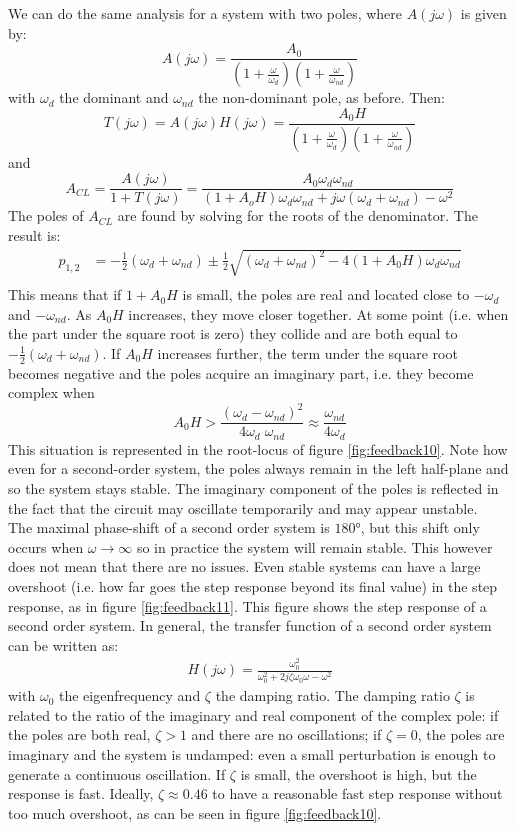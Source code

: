 We can do the same analysis for a system with two poles, where $A(j\omega)$ is given by:
$$
A(j \omega) = \frac{A_0}{(1 + \frac{\omega}{\omega_d})(1 + \frac{\omega}{\omega_{nd}})}
$$
with $\omega_d$ the dominant and $\omega_{nd}$ the non-dominant pole, as before. Then:
$$T(j\omega) = A(j\omega) H(j\omega) = \frac{A_0 H}{(1 + \frac{\omega}{\omega_d})(1 + \frac{\omega}{\omega_{nd}})}$$
and
$$
A_{CL} = \frac{A(j\omega)}{1 + T(j\omega)} = \frac{A_0 \omega_d \omega_{nd}}{(1 + A_o H) \omega_d \omega_{nd} + j\omega(\omega_d + \omega_{nd}) - \omega^2}
$$
The poles of $A_{CL}$ are found by solving for the roots of the denominator. The result is:
\begin{align*}
p_{1, 2} &= -\frac{1}{2}(\omega_d + \omega_{nd}) \pm \frac{1}{2} \sqrt{ (\omega_d + \omega_{nd})^2 - 4(1 + A_0H)\omega_d \omega_{nd}} \\
\end{align*}
This means that if $1+A_0H$ is small, the poles are real and located close to $-\omega_d$ and $-\omega_{nd}$. As $A_0H$ increases, they move closer together. At some point (i.e. when the part under the square root is zero) they collide and are both equal to $-\frac{1}{2}(\omega_d + \omega_{nd})$. If  $A_0H$ increases further, the term under the square root becomes negative and the poles acquire an imaginary part, i.e. they become complex when 
$$A_0H > \frac{(\omega_d - \omega_{nd})^2}{4 \omega_d \; \omega_{nd}} \approx \frac{\omega_{nd}}{4\omega_d}$$
This situation is represented in the root-locus of figure \ref{fig:feedback10}. Note how even for a second-order system, the poles always remain in the left half-plane and so the system stays stable. The imaginary component of the poles is reflected in the fact that the circuit may oscillate temporarily and may appear unstable. \\
The maximal phase-shift of a second order system is $180$°, but this shift only occurs when $\omega \rightarrow \infty$ so in practice the system will remain stable. This however does not mean that there are no issues. Even stable systems can have a large overshoot (i.e. how far goes the step response beyond its final value) in the step response, as in figure \ref{fig:feedback11}. This figure shows the step response of a second order system. In general, the transfer function of a second order system can be written as:
\begin{align}
	H(j \omega) = \frac{\omega_0^2}{\omega_0^2 +2j\zeta \omega_0 \omega - \omega^2}
\end{align}
with $\omega_0$ the eigenfrequency and $\zeta$ the damping ratio. The damping ratio $\zeta$ is related to the ratio of the imaginary and real component of the complex pole: if the poles are both real, $\zeta > 1$ and there are no oscillations; if $\zeta = 0$, the poles are imaginary and the system is undamped: even a small perturbation is enough to generate a continuous oscillation. If $\zeta$ is small, the overshoot is high, but the response is fast. Ideally, $\zeta \approx 0.46$ to have a reasonable fast step response without too much overshoot, as can be seen in figure \ref{fig:feedback10}.\\


